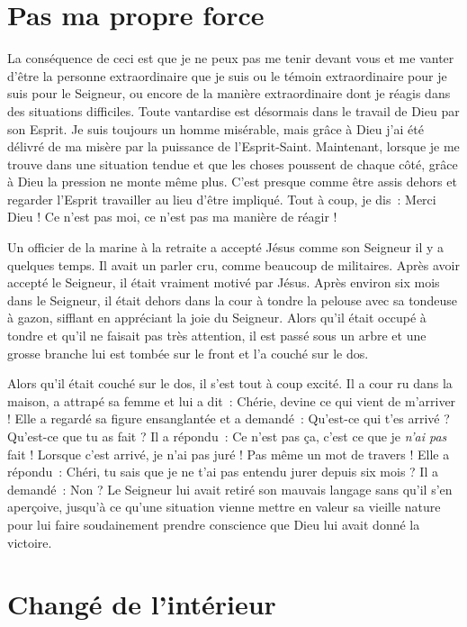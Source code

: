 \section*{Pas ma propre force}

La conséquence de ceci est que je ne peux pas me tenir devant vous
 et me vanter d'être la personne extraordinaire que je suis
 ou le témoin extraordinaire pour je suis pour le Seigneur,
 ou encore de la manière extraordinaire dont je réagis dans des
 situations difficiles.
 Toute vantardise est désormais dans le travail de Dieu par son Esprit.
 Je suis toujours un homme misérable, mais grâce à Dieu
 j'ai été délivré de ma misère par la puissance de l'Esprit-Saint.
 Maintenant, lorsque je me trouve dans une situation tendue
 et que les choses poussent de chaque côté, grâce à Dieu la pression
 ne monte même plus.
 C'est presque comme être assis dehors et regarder l'Esprit travailler
 au lieu d'être impliqué.
 Tout à coup, je dis~:
 \og Merci Dieu ! Ce n'est pas moi,
 ce n'est pas ma manière de réagir ! \fg{}

Un officier de la marine à la retraite a accepté Jésus comme son Seigneur
 il y a quelques temps.
 Il avait un parler cru, comme beaucoup de militaires.
 Après avoir accepté le Seigneur, il était vraiment motivé par Jésus.
 Après environ six mois dans le Seigneur, il était dehors dans la cour
 à tondre la pelouse avec sa tondeuse à gazon, sifflant en appréciant
 la joie du Seigneur.
 Alors qu'il était occupé à tondre et qu'il ne faisait pas très attention,
 il est passé sous un arbre et une grosse branche lui est tombée sur le front
 et l'a couché sur le dos.

Alors qu'il était couché sur le dos, il s'est tout à coup excité.
 Il a cour ru dans la maison, a attrapé sa femme et lui a dit~:
 \og Chérie, devine ce qui vient de m'arriver ! \fg{}
 Elle a regardé sa figure ensanglantée et a demandé~:
 \og Qu'est-ce qui t'es arrivé ? Qu'est-ce que tu as fait ? \fg{}
 Il a répondu~:
 \og Ce n'est pas ça, c'est ce que je \emph{n'ai pas} fait !
 Lorsque c'est arrivé, je n'ai pas juré ! Pas même un mot de travers ! \fg{}
 Elle a répondu~:
 \og Chéri, tu sais que je ne t'ai pas entendu jurer depuis six mois ? \fg{}
 Il a demandé~: \og Non ? \fg{}
 Le Seigneur lui avait retiré son mauvais langage sans qu'il s'en aperçoive,
 jusqu'à ce qu'une situation vienne mettre en valeur sa vieille nature
 pour lui faire soudainement prendre conscience
 que Dieu lui avait donné la victoire.


\section*{Changé de l'intérieur}

